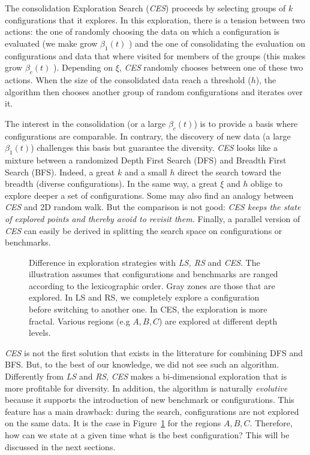 \documentclass[10pt, conference, compsocconf]{IEEEtran}
\begin{document}
The consolidation Exploration Search ({\it CES}) proceeds by selecting groups of $k$ configurations that it explores. 
In this exploration, there is a tension between two actions: the one of randomly choosing the data on which a 
configuration is evaluated (we make grow $\beta_1(t)$ ) and the one of consolidating the evaluation on configurations and data that where visited for 
members of the groups (this makes grow  $\beta_c(t)$ ). Depending on $\xi$, {\it CES} randomly chooses between one of these 
two actions. When the size of the consolidated data reach a threshold ($h$), the algorithm then chooses another group of 
random configurations and iterates over it.

The interest in the consolidation (or a large $\beta_c(t)$) is to provide a basis where configurations are comparable. In contrary, 
the discovery of new data (a large $\beta_1(t)$) challenges this basis but guarantee the diversity. 
{\it CES} looks like a mixture between a randomized Depth First Search (DFS) and Breadth First Search (BFS). 
Indeed, a great $k$ and a small $h$ direct the search toward the breadth (diverse configurations). In the same way, a great $\xi$ and $h$ 
oblige to explore deeper a set of configurations. Some may also find an analogy between {\it CES} and 2D random 
walk. But the comparison is not good:{ \it  {\it CES} keeps the state of explored points and thereby 
avoid to revisit them.} Finally, a parallel version of  {\it CES} can easily be derived in splitting the search space on 
configurations or benchmarks. 
	\begin{figure}[hbtp]
	\begin{center}
	
	\caption{Difference in exploration strategies with {\it LS, RS} and {\it CES}. The illustration assumes that 
	configurations and benchmarks are ranged according to the lexicographic order. Gray zones are those that 
	are explored. In LS and RS, we completely explore a configuration before switching to another one. In CES, 
	the exploration is more fractal. Various 
	regions (e.g $A, B, C$) are explored at different depth levels.}
	\label{fig:Search}
	\end{center}
	\end{figure}

{\it  CES} is not the first solution that exists in the litterature for combining DFS and BFS. But, to the best of 
our knowledge, we did not see such an algorithm. 
Differently from {\it LS} and  {\it RS}, {\it  CES} makes a bi-dimensional exploration that is more profitable 
for diversity. In addition, the algorithm is naturally {\it evolutive} because it supports the introduction 
of new benchmark or configurations. This feature has a main drawback: during the search, configurations are not 
explored on the same data. It is the case in Figure~\ref{fig:Search} for the regions $A, B, C$. 
Therefore, how can we state at a given time what is the best configuration? 
This will be discussed in the next sections. 
\end{document}
